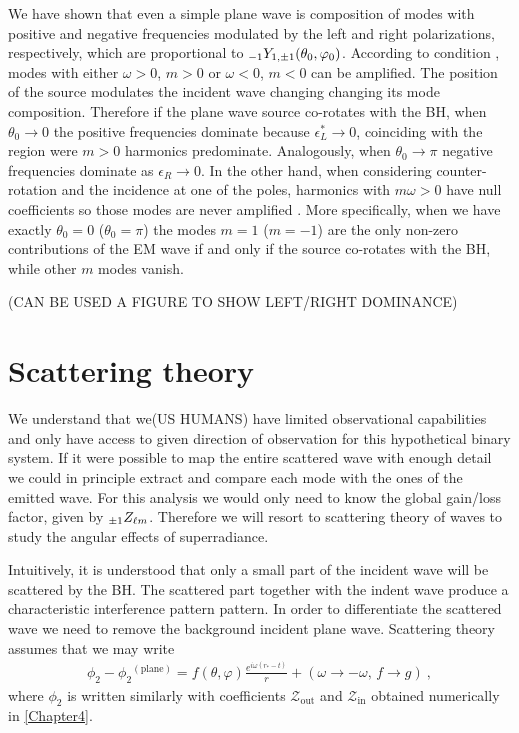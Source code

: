 We have shown that even a simple plane wave is composition of modes with positive and negative frequencies modulated by the left and right polarizations, respectively, which are proportional to $\uu[-1]{Y}{1, \pm 1}(\theta_0, \varphi_0)$.
According to condition , modes with either $\omega>0$, $m>0$ or $\omega<0$, $m<0$ can be amplified.
The position of the source modulates the incident wave changing changing its mode composition. 
Therefore if the plane wave source co-rotates with the BH, when $\theta_0 \to 0$ the positive frequencies dominate because $\epsilon_L^*\to 0$, coinciding with the region were $m>0$ harmonics predominate. Analogously, when $\theta_0\to\pi$ negative frequencies dominate as $\epsilon_R \to 0$.
In the other hand, when considering counter-rotation and the incidence at one of the poles, harmonics with $m \omega >0$ have null coefficients so those modes are never amplified \cite{Rosa2016}.
More specifically, when we have exactly $\theta_0=0$ ($\theta_0=\pi$) the modes $m=1$ ($m=-1$) are the only non-zero contributions of the EM wave if and only if the source co-rotates with the BH, while other $m$ modes vanish.

(CAN BE USED A FIGURE TO SHOW LEFT/RIGHT DOMINANCE)


\section{Scattering theory}

We understand that we(US HUMANS) have limited observational capabilities and only have access to given direction of observation for this hypothetical binary system.
If it were possible to map the entire scattered wave with enough detail we could in principle extract and compare each mode with the ones of the emitted wave. For this analysis we would only need to know the global gain/loss factor, given by $\uu[\pm1]Z{\ell m}$. Therefore we will resort to scattering theory of waves to study the angular effects of superradiance.

Intuitively, it is understood that only a small part of the incident wave will be scattered by the BH.
The scattered part together with the indent wave produce a characteristic interference pattern pattern.
In order to differentiate the scattered wave we need to remove the background incident plane wave.
Scattering theory assumes that we may write
\begin{align}
    \label{eq5:scattering}
    \phi_2 - \phi_2{}^{(\mathrm{plane})} = f(\theta,\varphi) \frac{e^{i \omega (r_{*}-t)}}{r} + (\omega\to-\omega, \,f \to g) ~,
\end{align}
where $\phi_2$ is written similarly with coefficients $\mathscr{Z}_\mathrm{out}$ and $\mathscr{Z}_\mathrm{in}$ obtained numerically in \cref{Chapter4}.

